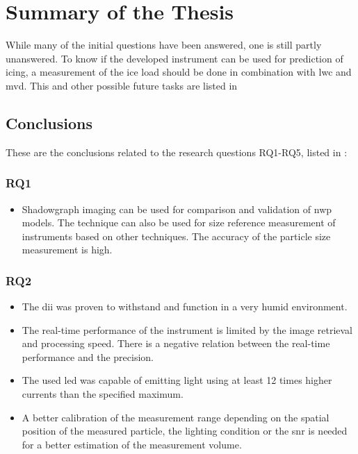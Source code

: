\chapter{Summary of the Thesis}
\label{chap:summary}

While many of the initial questions have been answered, one is still partly unanswered. To know if the developed instrument can be used for prediction of icing, a measurement of the ice load should be done in combination with \gls{lwc} and \gls{mvd}. This and other possible future tasks are listed in 

\section{Conclusions}

These are the conclusions related to the research questions RQ1-RQ5, listed in :

\subsection{RQ1}
\reqone
\begin{itemize}
\item Shadowgraph imaging can be used for comparison and validation of \gls{nwp} models. The technique can also be used for size reference measurement of instruments based on other techniques. The accuracy of the particle size measurement is high.
\end{itemize}

\subsection{RQ2}
\reqtwo
\begin{itemize}
\item The \gls{dii} was proven to withstand and function in a very humid environment.
\item The real-time performance of the instrument is limited by the image retrieval and processing speed. There is a negative relation between the real-time performance and the precision.
\item The used \gls{led} was capable of emitting light using at least 12 times higher currents than the specified maximum.
\item A better calibration of the measurement range depending on the spatial position of the measured particle, the lighting condition or the \gls{snr} is needed for a better estimation of the measurement volume.
\end{itemize}

